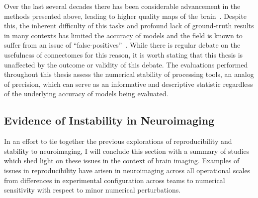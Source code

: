 Over the last several decades there has been considerable advancement in the methods presented above, leading to higher
quality maps of the brain~\cite{GIRARD2020117201}. Despite this, the inherent difficulty of this tasks and profound
lack of ground-truth results in many contexts has limited the accuracy of models and the field is known to suffer from
an issue of ``false-positives''~\cite{Thomas16574,sotiropoulos2019building,maier2017challenge}. While there is regular
debate on the usefulness of connectomes for this reason, it is worth stating that this thesis is unaffected by the
outcome or validity of this debate. The evaluations performed throughout this thesis assess the numerical stability of
processing tools, an analog of precision, which can serve as an informative and descriptive statistic regardless of the
underlying accuracy of models being evaluated.

\subsection{Evidence of Instability in Neuroimaging}
In an effort to tie together the previous explorations of reproducibility and stability to neuroimaging, I will
conclude this section with a summary of studies which shed light on these issues in the context of brain imaging.
Examples of issues in reproducibility have arisen in neuroimaging across all operational scales from differences in
experimental configuration across teams to numerical sensitivity with respect to minor numerical perturbations.

